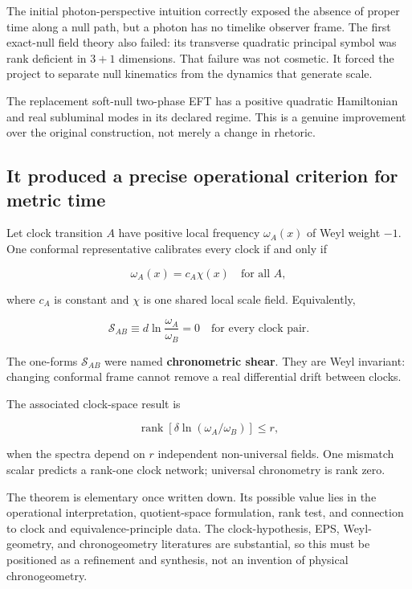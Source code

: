 \documentclass[
  10pt,
]{article}
\begin{document}
The initial photon-perspective intuition correctly exposed the absence
of proper time along a null path, but a photon has no timelike observer
frame. The first exact-null field theory also failed: its transverse
quadratic principal symbol was rank deficient in \(3+1\) dimensions.
That failure was not cosmetic. It forced the project to separate null
kinematics from the dynamics that generate scale.

The replacement soft-null two-phase EFT has a positive quadratic
Hamiltonian and real subluminal modes in its declared regime. This is a
genuine improvement over the original construction, not merely a change
in rhetoric.

\subsection{It produced a precise operational criterion for metric
time}\label{it-produced-a-precise-operational-criterion-for-metric-time}

Let clock transition \(A\) have positive local frequency \(\omega_A(x)\)
of Weyl weight \(-1\). One conformal representative calibrates every
clock if and only if

\[
\boxed{
\omega_A(x)=c_A\chi(x)
\quad\text{for all }A,
}
\]

where \(c_A\) is constant and \(\chi\) is one shared local scale field.
Equivalently,

\[
\boxed{
\mathcal S_{AB}
\equiv d\ln\frac{\omega_A}{\omega_B}=0
\quad\text{for every clock pair.}
}
\]

The one-forms \(\mathcal S_{AB}\) were named \textbf{chronometric
shear}. They are Weyl invariant: changing conformal frame cannot remove
a real differential drift between clocks.

The associated clock-space result is

\[
\boxed{
\operatorname{rank}
\left[\delta\ln(\omega_A/\omega_B)\right]
\le r,
}
\]

when the spectra depend on \(r\) independent non-universal fields. One
mismatch scalar predicts a rank-one clock network; universal chronometry
is rank zero.

The theorem is elementary once written down. Its possible value lies in
the operational interpretation, quotient-space formulation, rank test,
and connection to clock and equivalence-principle data. The
clock-hypothesis, EPS, Weyl-geometry, and chronogeometry literatures are
substantial, so this must be positioned as a refinement and synthesis,
not an invention of physical chronogeometry.
\end{document}
